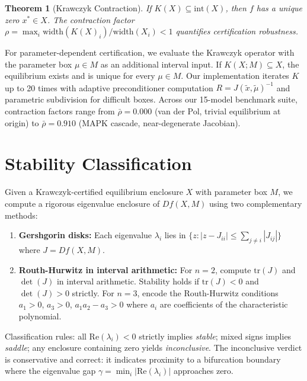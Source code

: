 \documentclass[11pt]{article}
\newtheorem{theorem}{Theorem}
\begin{document}
\begin{theorem}[Krawczyk Contraction]
\label{thm:krawczyk}
If $K(X) \subseteq \mathrm{int}(X)$, then $f$ has a unique zero $x^* \in X$.
The contraction factor $\rho = \max_i \mathrm{width}(K(X)_i) / \mathrm{width}(X_i) < 1$ quantifies certification robustness.
\end{theorem}

For parameter-dependent certification, we evaluate the Krawczyk operator with the parameter box $\mu \in M$ as an additional interval input.
If $K(X; M) \subseteq X$, the equilibrium exists and is unique for every $\mu \in M$.
Our implementation iterates $K$ up to 20 times with adaptive preconditioner computation $R = J(\tilde{x}, \tilde{\mu})^{-1}$ and parametric subdivision for difficult boxes.
Across our 15-model benchmark suite, contraction factors range from $\bar\rho = 0.000$ (van der Pol, trivial equilibrium at origin) to $\bar\rho = 0.910$ (MAPK cascade, near-degenerate Jacobian).

\section{Stability Classification}
\label{sec:stability}

Given a Krawczyk-certified equilibrium enclosure $X$ with parameter box $M$, we compute a rigorous eigenvalue enclosure of $Df(X, M)$ using two complementary methods:

\begin{enumerate}
\item \textbf{Gershgorin disks:} Each eigenvalue $\lambda_i$ lies in $\{z : |z - J_{ii}| \leq \sum_{j \neq i} |J_{ij}|\}$ where $J = Df(X, M)$.

\item \textbf{Routh-Hurwitz in interval arithmetic:} For $n=2$, compute $\mathrm{tr}(J)$ and $\det(J)$ in interval arithmetic.  Stability holds if $\mathrm{tr}(J) < 0$ and $\det(J) > 0$ strictly.
For $n=3$, encode the Routh-Hurwitz conditions $a_1 > 0$, $a_3 > 0$, $a_1 a_2 - a_3 > 0$ where $a_i$ are coefficients of the characteristic polynomial.
\end{enumerate}

Classification rules: all $\mathrm{Re}(\lambda_i) < 0$ strictly implies \emph{stable}; mixed signs implies \emph{saddle}; any enclosure containing zero yields \emph{inconclusive}.
The inconclusive verdict is conservative and correct: it indicates proximity to a bifurcation boundary where the eigenvalue gap $\gamma = \min_i |\mathrm{Re}(\lambda_i)|$ approaches zero.
\end{document}
